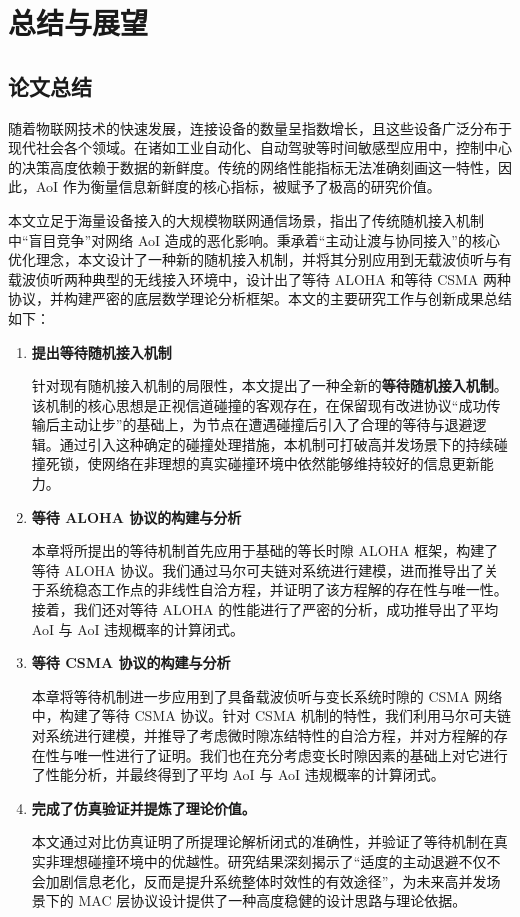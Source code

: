 \clearpage

\section{总结与展望}

\subsection{论文总结}
随着物联网技术的快速发展，连接设备的数量呈指数增长，且这些设备广泛分布于现代社会各个领域。在诸如工业自动化、自动驾驶等时间敏感型应用中，控制中心的决策高度依赖于数据的新鲜度。传统的网络性能指标无法准确刻画这一特性，因此，AoI 作为衡量信息新鲜度的核心指标，被赋予了极高的研究价值。

本文立足于海量设备接入的大规模物联网通信场景，指出了传统随机接入机制中“盲目竞争”对网络 AoI 造成的恶化影响。秉承着“主动让渡与协同接入”的核心优化理念，本文设计了一种新的随机接入机制，并将其分别应用到无载波侦听与有载波侦听两种典型的无线接入环境中，设计出了等待 ALOHA 和等待 CSMA 两种协议，并构建严密的底层数学理论分析框架。本文的主要研究工作与创新成果总结如下：
\begin{enumerate}[wide]
    \item \textbf{提出等待随机接入机制}

    针对现有随机接入机制的局限性，本文提出了一种全新的\textbf{等待随机接入机制}。该机制的核心思想是正视信道碰撞的客观存在，在保留现有改进协议“成功传输后主动让步”的基础上，为节点在遭遇碰撞后引入了合理的等待与退避逻辑。通过引入这种确定的碰撞处理措施，本机制可打破高并发场景下的持续碰撞死锁，使网络在非理想的真实碰撞环境中依然能够维持较好的信息更新能力。

    \item \textbf{等待 ALOHA 协议的构建与分析}

    本章将所提出的等待机制首先应用于基础的等长时隙 ALOHA 框架，构建了等待 ALOHA 协议。我们通过马尔可夫链对系统进行建模，进而推导出了关于系统稳态工作点的非线性自洽方程，并证明了该方程解的存在性与唯一性。接着，我们还对等待 ALOHA 的性能进行了严密的分析，成功推导出了平均 AoI 与 AoI 违规概率的计算闭式。

    \item \textbf{等待 CSMA 协议的构建与分析}

    本章将等待机制进一步应用到了具备载波侦听与变长系统时隙的 CSMA 网络中，构建了等待 CSMA 协议。针对 CSMA 机制的特性，我们利用马尔可夫链对系统进行建模，并推导了考虑微时隙冻结特性的自洽方程，并对方程解的存在性与唯一性进行了证明。我们也在充分考虑变长时隙因素的基础上对它进行了性能分析，并最终得到了平均 AoI 与 AoI 违规概率的计算闭式。

    \item \textbf{完成了仿真验证并提炼了理论价值。}
    
    本文通过对比仿真证明了所提理论解析闭式的准确性，并验证了等待机制在真实非理想碰撞环境中的优越性。研究结果深刻揭示了“适度的主动退避不仅不会加剧信息老化，反而是提升系统整体时效性的有效途径”，为未来高并发场景下的 MAC 层协议设计提供了一种高度稳健的设计思路与理论依据。
\end{enumerate}

